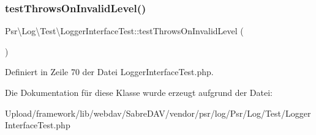 \subsubsection{\texorpdfstring{test\+Throws\+On\+Invalid\+Level()}{testThrowsOnInvalidLevel()}}
{\footnotesize\ttfamily Psr\textbackslash{}\+Log\textbackslash{}\+Test\textbackslash{}\+Logger\+Interface\+Test\+::test\+Throws\+On\+Invalid\+Level (\begin{DoxyParamCaption}{ }\end{DoxyParamCaption})}



Definiert in Zeile 70 der Datei Logger\+Interface\+Test.\+php.



Die Dokumentation für diese Klasse wurde erzeugt aufgrund der Datei\+:\begin{DoxyCompactItemize}
\item 
Upload/framework/lib/webdav/\+Sabre\+D\+A\+V/vendor/psr/log/\+Psr/\+Log/\+Test/Logger\+Interface\+Test.\+php\end{DoxyCompactItemize}

